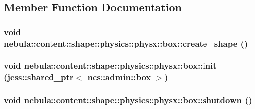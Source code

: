 \subsection{Member Function Documentation}
\hypertarget{classnebula_1_1content_1_1shape_1_1physics_1_1physx_1_1box_aefdbed35ebe13c28f533bcae59fd9d32}{
\subsubsection[{create\_\-shape}]{\setlength{\rightskip}{0pt plus 5cm}void nebula::content::shape::physics::physx::box::create\_\-shape ()}}
\label{classnebula_1_1content_1_1shape_1_1physics_1_1physx_1_1box_aefdbed35ebe13c28f533bcae59fd9d32}
\hypertarget{classnebula_1_1content_1_1shape_1_1physics_1_1physx_1_1box_a0757a121f19b6fdeb814f0e8e0642bdb}{
\subsubsection[{init}]{\setlength{\rightskip}{0pt plus 5cm}void nebula::content::shape::physics::physx::box::init (jess::shared\_\-ptr$<$ {\bf ncs::admin::box} $>$)}}
\label{classnebula_1_1content_1_1shape_1_1physics_1_1physx_1_1box_a0757a121f19b6fdeb814f0e8e0642bdb}
\hypertarget{classnebula_1_1content_1_1shape_1_1physics_1_1physx_1_1box_a0298108f52d58835399ac2be44a8cafe}{
\subsubsection[{shutdown}]{\setlength{\rightskip}{0pt plus 5cm}void nebula::content::shape::physics::physx::box::shutdown ()}}
\label{classnebula_1_1content_1_1shape_1_1physics_1_1physx_1_1box_a0298108f52d58835399ac2be44a8cafe}



